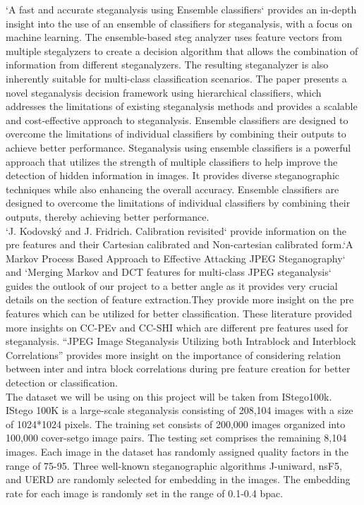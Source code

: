 `A fast and accurate steganalysis using Ensemble classifiers`\cite{6} provides an in-depth insight into the use of an ensemble of classifiers for steganalysis, with a focus on machine learning. The ensemble-based steg analyzer uses feature vectors from multiple stegalyzers to create a decision algorithm that allows the combination of information from different steganalyzers. The resulting steganalyzer is also inherently suitable for multi-class classification scenarios. The paper presents a novel steganalysis decision framework using hierarchical classifiers, which addresses the limitations of existing steganalysis methods and provides a scalable and cost-effective approach to steganalysis. Ensemble classifiers are designed to overcome the limitations of individual classifiers by combining their outputs to achieve better performance. Steganalysis using ensemble classifiers is a powerful approach that utilizes the strength of multiple classifiers to help improve the detection of hidden information in images. It provides diverse steganographic techniques while also enhancing the overall accuracy. Ensemble classifiers are designed to overcome the limitations of individual classifiers by combining their outputs, thereby achieving better performance.\\
`J. Kodovský and J. Fridrich. Calibration revisited`\cite{9} provide information on the pre features and their Cartesian calibrated and Non-cartesian calibrated form.`A Markov Process Based Approach to Effective Attacking JPEG Steganography`\cite{10} and `Merging Markov and DCT features for multi-class JPEG steganalysis`\cite{11}  guides the outlook of our project to a better angle as it provides very crucial details on the section of feature extraction.They provide more insight on the pre features which can be utilized for better classification. These literature provided more insights on CC-PEv and CC-SHI which are different pre features used for steganalysis. “JPEG Image Steganalysis Utilizing both Intrablock and Interblock Correlations”  provides more insight on the importance of considering relation between inter and intra block correlations during pre feature creation for better detection or classification. \\
The dataset we will be using on this project will be taken from IStego100k\cite{7}. IStego 100K is a large-scale steganalysis consisting of 208,104 images with a size of 1024*1024 pixels. The training set consists of 200,000 images organized into 100,000 cover-setgo image pairs. The testing set comprises the remaining 8,104 images. Each image in the dataset has randomly assigned quality factors in the range of 75-95. Three well-known steganographic algorithms J-uniward, nsF5, and UERD\cite{}\cite{}\cite{} are randomly selected for embedding in the images. The embedding rate for each image is randomly set in the range of 0.1-0.4 bpac. 

